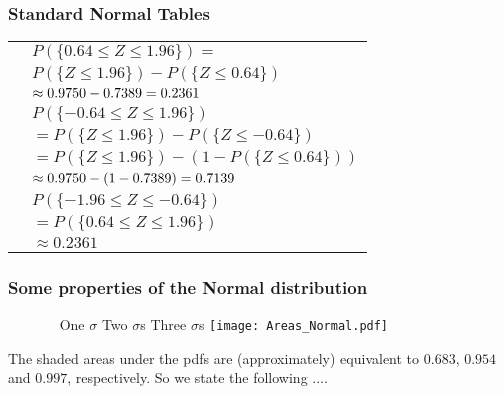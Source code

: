 \documentclass[notes=show,smaller,handout]{beamer}\usepackage[]{graphicx}\usepackage[]{color}
\begin{document}
\begin{frame}%
\frametitle{Standard Normal Tables}

\begin{example}[cont'd]

\begin{tabular}{ll}
& $P(\{0.64\leq Z\leq 1.96\})=$ \\
& $P(\{Z\leq 1.96\})-P(\{Z\leq 0.64\})$ \\
& $\approx 0.9750-0.7389=0.2361\bigskip $ \\
& $P(\{-0.64\leq Z\leq 1.96\})$ \\
& $=P(\{Z\leq 1.96\})-P(\{Z\leq -0.64\})$ \\
& $=P(\{Z\leq 1.96\})-(1-P(\{Z\leq 0.64\}))$ \\
& $\approx0.9750-(1-0.7389)=0.7139\bigskip $ \\
& $P(\{-1.96\leq Z\leq -0.64\})$ \\
& $=P(\{0.64\leq Z\leq 1.96\})$ \\
& $\approx0.2361$%
\end{tabular}
\end{example}
\end{frame}%

\begin{frame}%

\frametitle{Some properties of the Normal distribution}


\begin{figure}[ptb]\centering
\ \hspace{0.6cm} One $\sigma$ \hspace{2.4cm} Two $\sigma$s \hspace{2.5cm} Three $\sigma$s \hspace{3cm}
\texttt{[image: Areas\_Normal.pdf]}%
\end{figure}%
The shaded areas under the pdfs are (approximately) equivalent to $0.683$, $0.954$ and $0.997$,
respectively. So we state  the following ....

\end{frame}%
\end{document}

